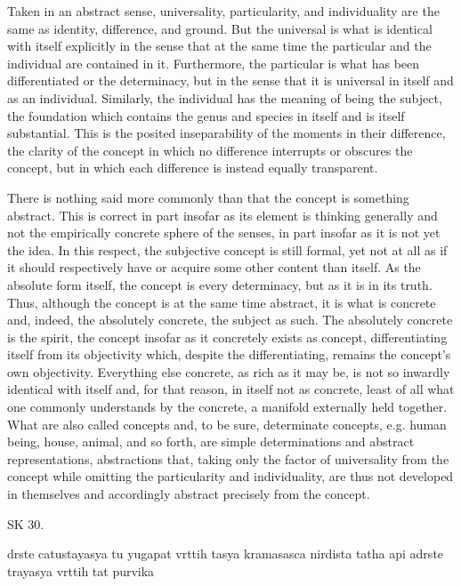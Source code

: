     Taken in an abstract sense, universality, particularity, and individuality
    are the same as identity, difference, and ground.
    But the universal is what is identical with itself explicitly
    in the sense that at the same time the particular and the individual
    are contained in it.
    Furthermore, the particular is what has been differentiated or the determinacy,
    but in the sense that it is universal in itself and as an individual.
    Similarly, the individual has the meaning of being the subject,
    the foundation which contains the genus and species in itself
    and is itself substantial.
    This is the posited inseparability of the moments
    in their difference, the clarity of the concept in which
    no difference interrupts or obscures the concept,
    but in which each difference is instead equally transparent.

    There is nothing said more commonly than that the concept is something abstract.
    This is correct in part insofar as its element is thinking generally and
    not the empirically concrete sphere of the senses,
    in part insofar as it is not yet the idea.
    In this respect, the subjective concept is still formal,
    yet not at all as if it should respectively have or acquire
    some other content than itself.
    As the absolute form itself, the concept is every determinacy,
    but as it is in its truth.
    Thus, although the concept is at the same time abstract,
    it is what is concrete and, indeed, the absolutely concrete,
    the subject as such.
    The absolutely concrete is the spirit,
    the concept insofar as it concretely exists as concept,
    differentiating itself from its objectivity which,
    despite the differentiating, remains the concept's own objectivity.
    Everything else concrete, as rich as it may be,
    is not so inwardly identical with itself and, for that reason,
    in itself not as concrete, least of all what one commonly understands
    by the concrete, a manifold externally held together.
    What are also called concepts and, to be sure, determinate concepts,
    e.g. human being, house, animal, and so forth, are
    simple determinations and abstract representations,
    abstractions that, taking only the factor of universality
    from the concept while omitting the particularity and individuality,
    are thus not developed in themselves and
    accordingly abstract precisely from the concept.

SK 30.

drste catustayasya tu yugapat vrttih tasya kramasasca nirdista
tatha api adrste trayasya vrttih tat purvika

